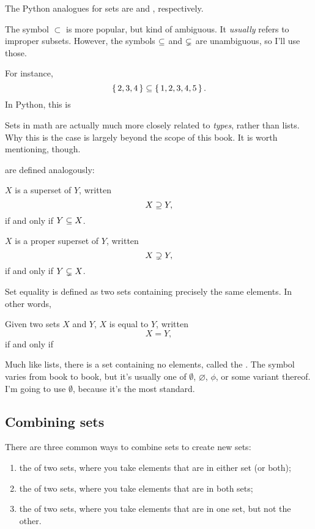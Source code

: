 The Python analogues for sets are \code{<=} and \code{<},
respectively.

\begin{remark}
  The symbol $\subset$ is more popular, but kind of ambiguous. It
  \emph{usually} refers to improper subsets. However, the symbols
  $\subseteq$ and $\subsetneq$ are unambiguous, so I'll use those.
\end{remark}

For instance, $$\left\{\, 2,3,4 \,\right\} \subseteq \left\{\, 1,2,3,4,5 \,\right\}.$$ In Python,
this is


\begin{remark}
  Sets in math are actually much more closely related to \emph{types},
  rather than lists. Why this is the case is largely beyond the scope
  of this book. It is worth mentioning, though.
\end{remark}

 are defined analogously:

\begin{definition}
  $X$ is a superset of $Y$, written $$X \supseteq Y,$$ if and only if
  $Y \subseteq X$.
\end{definition}

\begin{definition}
  $X$ is a proper superset of $Y$, written $$X \supsetneq Y,$$ if and
  only if $Y \subsetneq X$.
\end{definition}

Set equality is defined as two sets containing precisely the same
elements. In other words,

\begin{definition}
  Given two sets $X$ and $Y$, $X$ is equal to $Y$, written $$X = Y,$$
  if and only if 
\end{definition}

Much like lists, there is a set containing no elements, called the
. The symbol varies from book to book, but it's usually
one of $\emptyset$, $\varnothing$, $\phi$, or some variant
thereof. I'm going to use $\emptyset$, because it's the most standard.

\subsection{Combining sets}

There are three common ways to combine sets to create new sets:

\begin{enumerate}
\item the  of two sets, where you take elements that are
  in either set (or both);
\item the  of two sets, where you take elements
  that are in both sets;
\item the  of two sets, where you take elements that
  are in one set, but not the other.
\end{enumerate}

